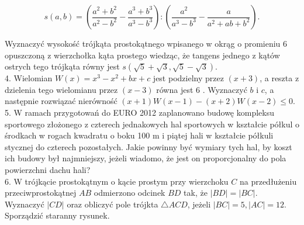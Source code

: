 \documentclass[10pt]{article}
\begin{document}
$$
s(a, b)=\left(\frac{a^{2}+b^{2}}{a^{2}-b^{2}}-\frac{a^{3}+b^{3}}{a^{3}-b^{3}}\right):\left(\frac{a^{2}}{a^{3}-b^{3}}-\frac{a}{a^{2}+a b+b^{2}}\right) .
$$

Wyznaczyć wysokość trójkąta prostokątnego wpisanego w okrąg o promieniu 6 opuszczoną z wierzchołka kąta prostego wiedząc, że tangens jednego z kątów ostrych tego trójkąta równy jest $s(\sqrt{5}+\sqrt{3}, \sqrt{5}-\sqrt{3})$.\\
4. Wielomian $W(x)=x^{3}-x^{2}+b x+c$ jest podzielny przez $(x+3)$, a reszta z dzielenia tego wielomianu przez $(x-3)$ równa jest 6 . Wyznaczyć $b$ i $c$, a następnie rozwiązać nierówność $(x+1) W(x-1)-(x+2) W(x-2) \leqslant 0$.\\
5. W ramach przygotowań do EURO 2012 zaplanowano budowę kompleksu sportowego złożonego z czterech jednakowych hal sportowych w kształcie półkul o środkach w rogach kwadratu o boku 100 m i piątej hali w kształcie półkuli stycznej do czterech pozostałych. Jakie powinny być wymiary tych hal, by koszt ich budowy był najmniejszy, jeżeli wiadomo, że jest on proporcjonalny do pola powierzchni dachu hali?\\
6. W trójkącie prostokątnym o kącie prostym przy wierzchoku $C$ na przedłużeniu przeciwprostokątnej $A B$ odmierzono odcinek $B D$ tak, że $|B D|=|B C|$. Wyznaczyć $|C D|$ oraz obliczyć pole trójkta $\triangle A C D$, jeżeli $|B C|=5,|A C|=12$. Sporządzić staranny rysunek.
\end{document}
